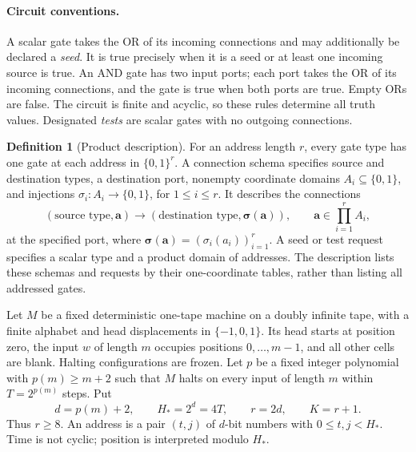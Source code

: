 \documentclass[11pt]{article}
\theoremstyle{definition}
\newtheorem{definition}[theorem]{Definition}
\begin{document}
\paragraph{Circuit conventions.}
A scalar gate takes the OR of its incoming connections and may additionally
be declared a \emph{seed}. It is true precisely when it is a seed or at
least one incoming source is true. An AND gate has two input ports; each
port takes the OR of its incoming connections, and the gate is true when
both ports are true. Empty ORs are false. The circuit is finite and
acyclic, so these rules determine all truth values. Designated
\emph{tests} are scalar gates with no outgoing connections.

\begin{definition}[Product description]\label{def:computation-product}
For an address length $r$, every gate type has one gate at each address in
$\{0,1\}^r$. A connection schema specifies source and destination types,
a destination port, nonempty coordinate domains
$A_i\subseteq\{0,1\}$, and injections
$\sigma_i:A_i\longrightarrow\{0,1\}$, for $1\le i\le r$.
It describes the connections
\[
 (\text{source type},\mathbf a)
 \longrightarrow
 (\text{destination type},\boldsymbol\sigma(\mathbf a)),
 \qquad
 \mathbf a\in\prod_{i=1}^r A_i,
\]
at the specified port, where
$\boldsymbol\sigma(\mathbf a)=(\sigma_i(a_i))_{i=1}^r$.
A seed or test request specifies a scalar type and a product domain of
addresses. The description lists these schemas and requests by their
one-coordinate tables, rather than listing all addressed gates.
\end{definition}

Let \(M\) be a fixed deterministic one-tape machine on a doubly infinite
tape, with a finite alphabet and head displacements in \(\{-1,0,1\}\).
Its head starts at position zero, the input \(w\) of length \(m\) occupies
positions \(0,\ldots,m-1\), and all other cells are blank. Halting
configurations are frozen. Let \(p\) be a fixed integer polynomial with
\(p(m)\ge m+2\) such that \(M\) halts on every input of length \(m\)
within \(T=2^{p(m)}\) steps. Put
\begin{equation}\label{eq:computation-parameters}
 d=p(m)+2,\qquad H_*=2^d=4T,\qquad r=2d,\qquad K=r+1.
\end{equation}
Thus \(r\ge8\). An address is a pair \((t,j)\) of \(d\)-bit numbers
with \(0\le t,j<H_*\). Time is not cyclic; position is interpreted
modulo \(H_*\).
\end{document}
